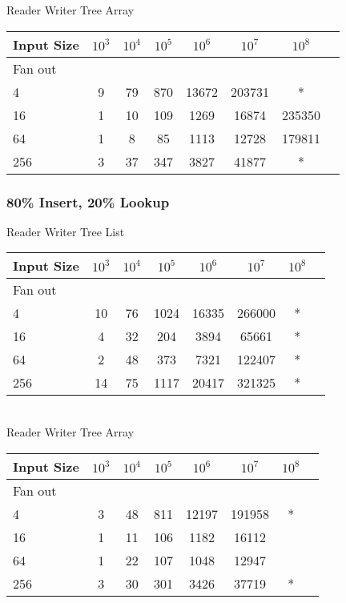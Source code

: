 \documentclass{sig-alternate}
\begin{document}
Reader Writer Tree Array \\
\begin{tabular}{| l | c | c | c | c | c | c | r}
  \hline
  Input Size & $10^3$ & $10^4$ & $10^5$ & $10^6$ & $10^7$ & $10^8$ \\ \hline
  Fan out & & & & & &  \\  \hline
  4			&	9 & 79 & 870 & 13672 & 203731 & * \\
  16		&	1 & 10 & 109 & 1269 & 16874 & 235350 \\
  64		&	1 & 8 & 85 & 1113 & 12728 & 179811 \\
  256		&	3 & 37 & 347 & 3827 & 41877 & * \\
  \hline
\end{tabular} 

\subsubsection{80\% Insert, 20\% Lookup}
Reader Writer Tree List \\
\begin{tabular}{| l | c | c | c | c | c | c | r}
  \hline
  Input Size & $10^3$ & $10^4$ & $10^5$ & $10^6$ & $10^7$ & $10^8$ \\ \hline
  Fan out & & & & & &  \\  \hline
  4			&	10 & 76 & 1024 & 16335 & 266000 & * \\
  16		&	4 & 32 & 204 & 3894 & 65661 & * \\
  64		&	2 & 48 & 373 & 7321 & 122407 & * \\
  256		&	14 & 75 & 1117 & 20417 & 321325 & * \\
  \hline
\end{tabular} \\

Reader Writer Tree Array \\
\begin{tabular}{| l | c | c | c | c | c | c | r}
  \hline
  Input Size & $10^3$ & $10^4$ & $10^5$ & $10^6$ & $10^7$ & $10^8$ \\ \hline
  Fan out & & & & & &  \\  \hline
  4			&	3 & 48 & 811 & 12197 & 191958 & * \\
  16		&	1 & 11 & 106 & 1182 & 16112 &  \\
  64		&	1 & 22 & 107 & 1048 & 12947 &  \\
  256		&	3 & 30 & 301 & 3426 & 37719 & * \\
  \hline
\end{tabular} 
\end{document}
